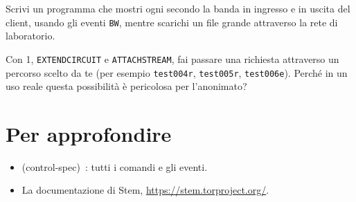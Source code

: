 \begin{esercizio}[2]\label{es:18-banda}
Scrivi un programma che mostri ogni secondo la banda in ingresso e in uscita del client, usando gli eventi \texttt{BW}, mentre scarichi un file grande attraverso la rete di laboratorio.
\end{esercizio}

\begin{esercizio}[3]\label{es:18-percorso}
Con  1, \texttt{EXTENDCIRCUIT} e \texttt{ATTACHSTREAM}, fai passare una richiesta attraverso un percorso scelto da te (per esempio \texttt{test004r}, \texttt{test005r}, \texttt{test006e}). Perché in un uso reale questa possibilità è pericolosa per l'anonimato?
\end{esercizio}

\section*{Per approfondire}
\begin{itemize}
  \item {} (control-spec)~\cite{torspec}: tutti i comandi e gli eventi.
  \item La documentazione di Stem, \url{https://stem.torproject.org/}.
\end{itemize}
